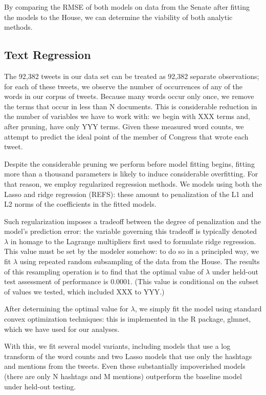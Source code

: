 \documentclass[11pt]{article}
\begin{document}
By comparing the RMSE of both models on data from the Senate after fitting the models to the House, we can determine the viability of both analytic methods.

\subsection{Text Regression}
The 92,382 tweets in our data set can be treated as 92,382 separate observations; for each of these tweets, we observe the number of occurrences of any of the words in our corpus of tweets. Because many words occur only once, we remove the terms that occur in less than N documents. This is considerable reduction in the number of variables we have to work with: we begin with XXX terms and, after pruning, have only YYY terms. Given these measured word counts, we attempt to predict the ideal point of the member of Congress that wrote each tweet.

Despite the considerable pruning we perform before model fitting begins, fitting more than a thousand parameters is likely to induce considerable overfitting. For that reason, we employ regularized regression methods. We models using both the Lasso and ridge regression (REFS): these amount to penalization of the L1 and L2 norms of the coefficients in the fitted models.

Such regularization imposes a tradeoff between the degree of penalization and the model's prediction error: the variable governing this tradeoff is typically denoted $\lambda$ in homage to the Lagrange multipliers first used to formulate ridge regression. This value must be set by the modeler somehow: to do so in a principled way, we fit $\lambda$ using repeated random subsampling of the data from the House. The results of this resampling operation is to find that the optimal value of $\lambda$ under held-out test assessment of performance is $0.0001$. (This value is conditional on the subset of values we tested, which included XXX to YYY.)

After determining the optimal value for $\lambda$, we simply fit the model using standard convex optimization techniques: this is implemented in the R package, glmnet, which we have used for our analyses.

With this, we fit several model variants, including models that use a log transform of the word counts and two Lasso models that use only the hashtags and mentions from the tweets. Even these substantially impoverished models (there are only N hashtags and M mentions) outperform the baseline model under held-out testing.
\end{document}
